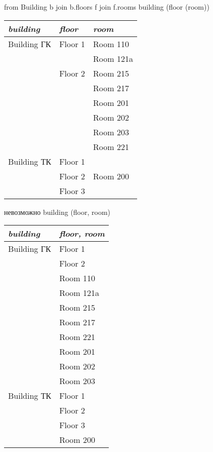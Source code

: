     {from Building b join b.floors f join f.rooms}
    {building (floor (room))}
    {\begin{tabular}{|l|l|l|}
	\hline
	\it{building} & \it{floor} & \it{room}\\[5pt]
	\hline
	\hline
	Building ГК & Floor 1 & Room 110\\
	\cline{3-3}
		    & & Room 121a \\
	\cline{2-3}
		    & Floor 2 & Room 215\\
	\cline{3-3}
		    & & Room 217\\
	\cline{3-3}
		    & & Room 201\\
	\cline{3-3}
		    & & Room 202\\
	\cline{3-3}
		    & & Room 203\\
	\cline{3-3}
		    & & Room 221\\
	\hline
	Building ТК & Floor 1 & \\	
	\cline{2-3}
		    & Floor 2 & Room 200\\
	\cline{2-3}
		    & Floor 3 & \\
	\hline
    \end{tabular}}

    {невозможно}
    {building (floor, room)}
    {\begin{tabular}{|l|l|}
	\hline
	\it{building} & \it{floor, room} \\[5pt]
	\hline
	\hline
	Building ГК & Floor 1\\
	\cline{2-2}
		    & Floor 2\\
	\cline{2-2}
		    & Room 110\\
	\cline{2-2}
		    & Room 121a\\
	\cline{2-2}
		    & Room 215\\
	\cline{2-2}
		    & Room 217\\
	\cline{2-2}
		    & Room 221\\
	\cline{2-2}
		    & Room 201\\
	\cline{2-2}
		    & Room 202\\
	\cline{2-2}
		    & Room 203\\
	\hline
	Building ТК & Floor 1\\	
	\cline{2-2}
		    & Floor 2\\
	\cline{2-2}
		    & Floor 3\\
	\cline{2-2}
		    & Room 200\\
	\hline
    \end{tabular}}


